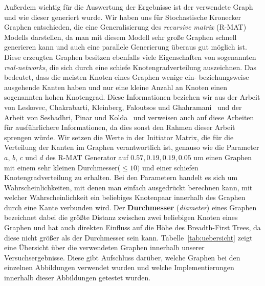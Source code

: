 \documentclass[11pt,a4paper]{article}
\begin{document}
Außerdem wichtig für die Auswertung der Ergebnisse ist der verwendete Graph und wie dieser generiert wurde. Wir haben uns für Stochastische Kronecker Graphen entschieden, die eine Generalisierung des \textit{recursive matrix} (R-MAT) Modells darstellen, da man mit diesem Modell sehr große Graphen schnell generieren kann und auch eine parallele Generierung überaus gut möglich ist. Diese erzeugten Graphen besitzen ebenfalls viele Eigenschaften von sogenannten \textit{real-networks}, die sich durch eine schiefe Knotengradverteilung auszeichnen. Das bedeutet, dass die meisten Knoten eines Graphen wenige ein- beziehungsweise ausgehende Kanten haben und nur eine kleine Anzahl an Knoten einen sogenannten hohen Knotengrad. Diese Informationen beziehen wir aus der Arbeit von Leskovec, Chakrabarti, Kleinberg, Faloutsos und Ghahramani~\cite{kronecker} und der Arbeit von Seshadhri, Pinar und Kolda~\cite{kronecker_study} und verweisen auch auf diese Arbeiten für ausführlichere Informationen, da dies sonst den Rahmen dieser Arbeit sprengen würde. Wir setzen die Werte in der Initiator Matrix, die für die Verteilung der Kanten im Graphen verantwortlich ist, genauso wie die Parameter \(a\), \(b\), \(c\) und \(d\) des R-MAT Generator auf \(0.57, 0.19, 0.19, 0.05\) um einen Graphen mit einem sehr kleinen Durchmesser(\(\leq 10)\) und einer schiefen Knotengradverteilung zu erhalten.  Bei den Parametern handelt es sich um Wahrscheinlichkeiten, mit denen man einfach ausgedrückt berechnen kann, mit welcher Wahrscheinlichkeit ein beliebiges Knotenpaar innerhalb des Graphen durch eine Kante verbunden wird. Der \textbf{Durchmesser} (\textit{diameter}) eines Graphen bezeichnet dabei die größte Distanz zwischen zwei beliebigen Knoten eines Graphen und hat auch direkten Einfluss auf die Höhe des Breadth-First Trees, da diese nicht größer als der Durchmesser sein kann. Tabelle~\ref{tab:uebersicht} zeigt eine Übersicht über die verwendeten Graphen innerhalb unserer Versuchsergebnisse. Diese gibt Aufschluss darüber, welche Graphen bei den einzelnen Abbildungen verwendet wurden und welche Implementierungen innerhalb dieser Abbildungen getestet wurden.\\
\end{document}
